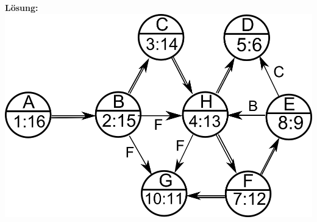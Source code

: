 \documentclass{scrartcl}
\begin{document}
\begin{enumerate}[(1)]
\textbf{Lösung:}\\
\includegraphics[width=0.75\linewidth]{images/tiefensuche_loes}\\

\end{enumerate}
\end{document}
